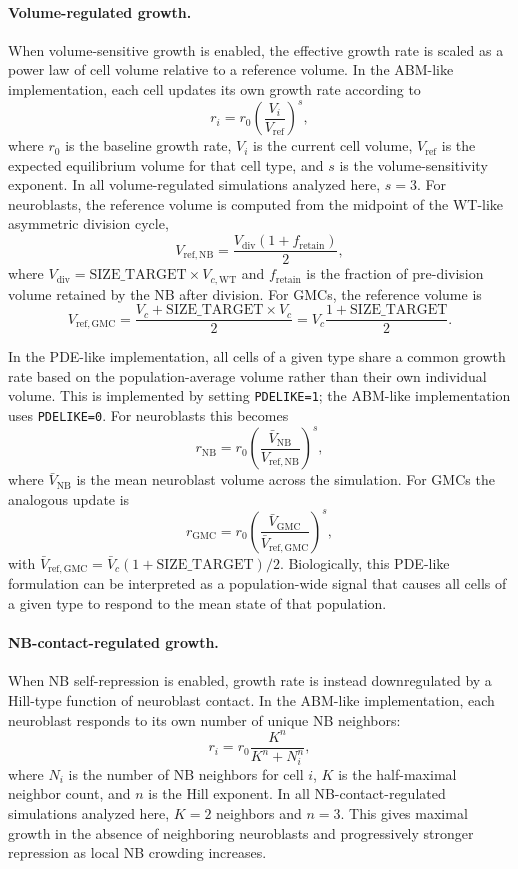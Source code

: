\paragraph{Volume-regulated growth.}
When volume-sensitive growth is enabled, the effective growth rate is scaled as a power law of cell volume relative to a reference volume.
In the ABM-like implementation, each cell updates its own growth rate according to
\[
r_i = r_0\left(\frac{V_i}{V_{\mathrm{ref}}}\right)^s,
\]
where \(r_0\) is the baseline growth rate, \(V_i\) is the current cell volume, \(V_{\mathrm{ref}}\) is the expected equilibrium volume for that cell type, and \(s\) is the volume-sensitivity exponent.
In all volume-regulated simulations analyzed here, \(s=3\).
For neuroblasts, the reference volume is computed from the midpoint of the WT-like asymmetric division cycle,
\[
V_{\mathrm{ref,NB}} = \frac{V_{\mathrm{div}}(1+f_{\mathrm{retain}})}{2},
\]
where \(V_{\mathrm{div}}=\mathrm{SIZE\_TARGET}\times V_{c,\mathrm{WT}}\) and \(f_{\mathrm{retain}}\) is the fraction of pre-division volume retained by the NB after division.
For GMCs, the reference volume is
\[
V_{\mathrm{ref,GMC}} = \frac{V_c + \mathrm{SIZE\_TARGET}\times V_c}{2}
= V_c\frac{1+\mathrm{SIZE\_TARGET}}{2}.
\]

In the PDE-like implementation, all cells of a given type share a common growth rate based on the population-average volume rather than their own individual volume.
This is implemented by setting \texttt{PDELIKE=1}; the ABM-like implementation uses \texttt{PDELIKE=0}.
For neuroblasts this becomes
\[
r_{\mathrm{NB}} = r_0\left(\frac{\bar V_{\mathrm{NB}}}{V_{\mathrm{ref,NB}}}\right)^s,
\]
where \(\bar V_{\mathrm{NB}}\) is the mean neuroblast volume across the simulation.
For GMCs the analogous update is
\[
r_{\mathrm{GMC}} = r_0\left(\frac{\bar V_{\mathrm{GMC}}}{\bar V_{\mathrm{ref,GMC}}}\right)^s,
\]
with \(\bar V_{\mathrm{ref,GMC}} = \bar V_c(1+\mathrm{SIZE\_TARGET})/2\).
Biologically, this PDE-like formulation can be interpreted as a population-wide signal that causes all cells of a given type to respond to the mean state of that population.

\paragraph{NB-contact-regulated growth.}
When NB self-repression is enabled, growth rate is instead downregulated by a Hill-type function of neuroblast contact.
In the ABM-like implementation, each neuroblast responds to its own number of unique NB neighbors:
\[
r_i = r_0\frac{K^n}{K^n + N_i^n},
\]
where \(N_i\) is the number of NB neighbors for cell \(i\), \(K\) is the half-maximal neighbor count, and \(n\) is the Hill exponent.
In all NB-contact-regulated simulations analyzed here, \(K=2\) neighbors and \(n=3\).
This gives maximal growth in the absence of neighboring neuroblasts and progressively stronger repression as local NB crowding increases.

